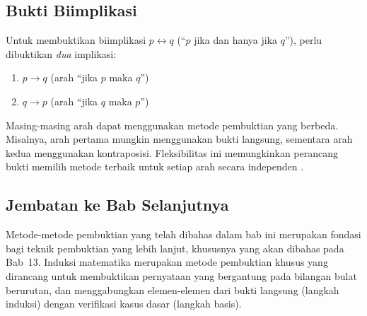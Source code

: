\subsection{Bukti Biimplikasi}

Untuk membuktikan biimplikasi $p \leftrightarrow q$ (``$p$ jika dan hanya jika $q$''), perlu dibuktikan \emph{dua} implikasi:
\begin{enumerate}
    \item $p \rightarrow q$ (arah ``jika $p$ maka $q$'')
    \item $q \rightarrow p$ (arah ``jika $q$ maka $p$'')
\end{enumerate}

Masing-masing arah dapat menggunakan metode pembuktian yang berbeda. Misalnya, arah pertama mungkin menggunakan bukti langsung, sementara arah kedua menggunakan kontraposisi. Fleksibilitas ini memungkinkan perancang bukti memilih metode terbaik untuk setiap arah secara independen \cite{hammack2018}.

\subsection{Jembatan ke Bab Selanjutnya}

Metode-metode pembuktian yang telah dibahas dalam bab ini merupakan fondasi bagi teknik pembuktian yang lebih lanjut, khususnya  yang akan dibahas pada Bab~13. Induksi matematika merupakan metode pembuktian khusus yang dirancang untuk membuktikan pernyataan yang bergantung pada bilangan bulat berurutan, dan menggabungkan elemen-elemen dari bukti langsung (langkah induksi) dengan verifikasi kasus dasar (langkah basis).
